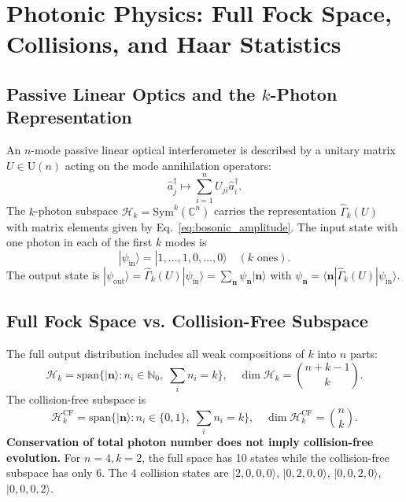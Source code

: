 \section{Photonic Physics: Full Fock Space, Collisions, and Haar Statistics}
\label{sec:photonic}

\subsection{Passive Linear Optics and the $k$-Photon Representation}

An $n$-mode passive linear optical interferometer is described by a unitary matrix $U \in \mathrm{U}(n)$ acting on the mode annihilation operators:
\begin{equation}
\hat{a}_j^\dagger \mapsto \sum_{i=1}^n U_{ji} \hat{a}_i^\dagger.
\end{equation}
The $k$-photon subspace $\mathcal{H}_k = \mathrm{Sym}^k(\mathbb{C}^n)$ carries the representation $\hat{\Gamma}_k(U)$ with matrix elements given by Eq.~\eqref{eq:bosonic_amplitude}. The input state with one photon in each of the first $k$ modes is
\begin{equation}
|\psi_{\mathrm{in}}\rangle = |1,\dots,1,0,\dots,0\rangle \quad (k \text{ ones}).
\end{equation}
The output state is $|\psi_{\mathrm{out}}\rangle = \hat{\Gamma}_k(U) |\psi_{\mathrm{in}}\rangle = \sum_{\mathbf{n}} \psi_{\mathbf{n}} |\mathbf{n}\rangle$ with $\psi_{\mathbf{n}} = \langle \mathbf{n} | \hat{\Gamma}_k(U) | \psi_{\mathrm{in}} \rangle$.

\subsection{Full Fock Space vs. Collision-Free Subspace}

The full output distribution includes all weak compositions of $k$ into $n$ parts:
\begin{equation}
\mathcal{H}_k = \mathrm{span}\{ |\mathbf{n}\rangle : n_i \in \mathbb{N}_0,\; \sum_i n_i = k \}, \quad \dim \mathcal{H}_k = \binom{n+k-1}{k}.
\end{equation}
The collision-free subspace is
\begin{equation}
\mathcal{H}_k^{\mathrm{CF}} = \mathrm{span}\{ |\mathbf{n}\rangle : n_i \in \{0,1\},\; \sum_i n_i = k \}, \quad \dim \mathcal{H}_k^{\mathrm{CF}} = \binom{n}{k}.
\end{equation}
\textbf{Conservation of total photon number does not imply collision-free evolution.} For $n=4, k=2$, the full space has 10 states while the collision-free subspace has only 6. The 4 collision states are $|2,0,0,0\rangle$, $|0,2,0,0\rangle$, $|0,0,2,0\rangle$, $|0,0,0,2\rangle$.

